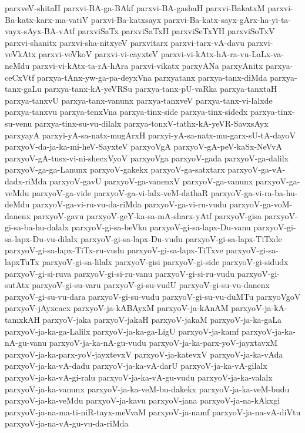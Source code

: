{parxveV-shitaH
parxvi-BA-ga-BAkf
parxvi-BA-gashaH
parxvi-BakatxM
parxvi-Ba-katx-karx-ma-vatiV
parxvi-Ba-katxsayx
parxvi-Ba-katx-sayx-gArx-ha-yi-ta-vayx-sAyx-BA-vAtf
parxviSaTx
parxviSaTxH
parxviSeTxYH
parxviSoTxV
parxvi-shanitx
parxvi-sha-nitxyeV
parxvitarx
parxvi-tarx-vA-davu
parxvi-veVkAtx
parxvi-veVkoV
parxvi-vi-cayxteV
parxvi-vi-kAtx-hA-ra-vu-LaLx-va-neMdu
parxvi-vi-kAtx-ta-rA-hAra
parxvi-vikatx
parxyANa
parxyAnitx
parxya-ceCxVtf
parxya-tAnx-yw-ga-pa-deyxVna
parxyatanx
parxya-tanx-diMda
parxya-tanx-gaLu
parxya-tanx-kA-yeVRSu
parxya-tanx-pU-vaRka
parxya-tanxtaH
parxya-tanxvU
parxya-tanx-vanunx
parxya-tanxveV
parxya-tanx-vi-lalxde
parxya-tanxvu
parxya-tenxVna
parxya-tinx-side
parxya-tinx-sidedx
parxya-tinx-su-venu
parxya-tinx-su-vu-dilalx
parxya-tonxV-tathx-kA-yeVR-SavxsAyx
parxyayA
parxyi-yA-sa-natx-mugArxH
parxyi-yA-sa-natx-mu-garx-sU-tA-dayoV
parxyoV-da-ja-ka-mi-heV-SayxteV
parxyoVgA
parxyoV-gA-peV-kaSx-NeVvA
parxyoV-gA-tusx-vi-ni-shecxVyoV
parxyoVga
parxyoV-gada
parxyoV-ga-dalilx
parxyoV-ga-ga-Lanunx
parxyoV-gakekx
parxyoV-ga-satxtarx
parxyoV-ga-vA-dadx-riMda
parxyoV-gavU
parxyoV-ga-vanenxV
parxyoV-ga-vanunx
parxyoV-ga-veMdu
parxyoV-ga-vide
parxyoV-ga-vi-lalx-veM-dathaR
parxyoV-ga-vi-ra-ba-hu-deMdu
parxyoV-ga-vi-ru-vu-da-riMda
parxyoV-ga-vi-ru-vudu
parxyoV-ga-voM-danenx
parxyoV-gavu
parxyoV-geY-ka-sa-mA-sharx-yAtf
parxyoV-gisa
parxyoV-gi-sa-ba-hu-dalalx
parxyoV-gi-sa-beVku
parxyoV-gi-sa-lapx-Du-vanu
parxyoV-gi-sa-lapx-Du-vu-dilalx
parxyoV-gi-sa-lapx-Du-vudu
parxyoV-gi-sa-lapx-TiTxde
parxyoV-gi-sa-lapx-TiTx-ru-vudu
parxyoV-gi-sa-lapx-TiTxve
parxyoV-gi-sa-lapxTuTx
parxyoV-gi-sa-lilalx
parxyoV-gisi
parxyoV-gi-side
parxyoV-gi-sidudx
parxyoV-gi-si-ruva
parxyoV-gi-si-ru-vanu
parxyoV-gi-si-ru-vudu
parxyoV-gi-sutAtx
parxyoV-gi-su-varu
parxyoV-gi-su-vudU
parxyoV-gi-su-vu-danenx
parxyoV-gi-su-vu-dara
parxyoV-gi-su-vudu
parxyoV-gi-su-vu-duMTu
parxyoVgoV
parxyoV-jAyxcacx
parxyoV-ja-kABAyxM
parxyoV-ja-kAnAM
parxyoV-ja-kA-tamxkAH
parxyoV-jaka
parxyoV-jakaH
parxyoV-jakaM
parxyoV-ja-ka-gaLa
parxyoV-ja-ka-ga-Lalilx
parxyoV-ja-ka-ga-LigU
parxyoV-ja-kamf
parxyoV-ja-ka-nA-gu-vanu
parxyoV-ja-ka-nA-gu-vudu
parxyoV-ja-ka-parx-yoV-jayxtavxM
parxyoV-ja-ka-parx-yoV-jayxtevxV
parxyoV-ja-katevxV
parxyoV-ja-ka-vAda
parxyoV-ja-ka-vA-dadu
parxyoV-ja-ka-vA-darU
parxyoV-ja-ka-vA-gilalx
parxyoV-ja-ka-vA-gi-ralu
parxyoV-ja-ka-vA-gu-vudu
parxyoV-ja-ka-valalx
parxyoV-ja-ka-vanunx
parxyoV-ja-ka-veM-bu-dakekx
parxyoV-ja-ka-veM-budu
parxyoV-ja-ka-veMdu
parxyoV-ja-kavu
parxyoV-jana
parxyoV-ja-na-kAkxgi
parxyoV-ja-na-ma-ti-niR-tayx-meVvaM
parxyoV-ja-namf
parxyoV-ja-na-vA-diVtu
parxyoV-ja-na-vA-gu-vu-da-riMda
}
